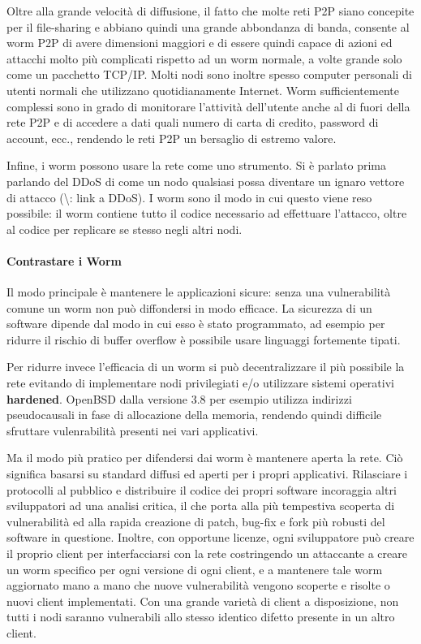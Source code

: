 Oltre alla grande velocità di diffusione, il fatto che molte reti P2P siano concepite per il file-sharing e abbiano quindi una grande abbondanza di banda, consente al worm P2P di avere dimensioni maggiori e di essere quindi capace di azioni ed attacchi molto più complicati rispetto ad un worm normale, a volte grande solo come un pacchetto TCP/IP. Molti nodi sono inoltre spesso computer personali di utenti normali che utilizzano quotidianamente Internet. Worm sufficientemente complessi sono in grado di monitorare l'attività dell'utente anche al di fuori della rete P2P e di accedere a dati quali numero di carta di credito, password di account, ecc., rendendo le reti P2P un bersaglio di estremo valore.

Infine, i worm possono usare la rete come uno strumento. Si è parlato prima parlando del DDoS di come un nodo qualsiasi possa diventare un ignaro vettore di attacco (\textbackslash{}\TODO: link a DDoS). I worm sono il modo in cui questo viene reso possibile: il worm contiene tutto il codice necessario ad effettuare l'attacco, oltre al codice per replicare se stesso negli altri nodi.

\paragraph{Contrastare i Worm}\label{contrastare-i-worm}

Il modo principale è mantenere le applicazioni sicure: senza una vulnerabilità comune un worm non può diffondersi in modo efficace. La sicurezza di un software dipende dal modo in cui esso è stato programmato, ad esempio per ridurre il rischio di buffer overflow è possibile usare linguaggi fortemente tipati.

Per ridurre invece l'efficacia di un worm si può decentralizzare il più possibile la rete evitando di implementare nodi privilegiati e/o utilizzare sistemi operativi \textbf{hardened}. OpenBSD dalla versione 3.8 per esempio utilizza indirizzi pseudocausali in fase di allocazione della memoria, rendendo quindi difficile sfruttare vulenrabilità presenti nei vari applicativi.

Ma il modo più pratico per difendersi dai worm è mantenere aperta la rete. Ciò significa basarsi su standard diffusi ed aperti per i propri applicativi. Rilasciare i protocolli al pubblico e distribuire il codice dei propri software incoraggia altri sviluppatori ad una analisi critica, il che porta alla più tempestiva scoperta di vulnerabilità ed alla rapida creazione di patch, bug-fix e fork più robusti del software in questione. Inoltre, con opportune licenze, ogni sviluppatore può creare il proprio client per interfacciarsi con la rete costringendo un attaccante a creare un worm specifico per ogni versione di ogni client, e a mantenere tale worm aggiornato mano a mano che nuove vulnerabilità vengono scoperte e risolte o nuovi client implementati. Con una grande varietà di client a disposizione, non tutti i nodi saranno vulnerabili allo stesso identico difetto presente in un altro client.

